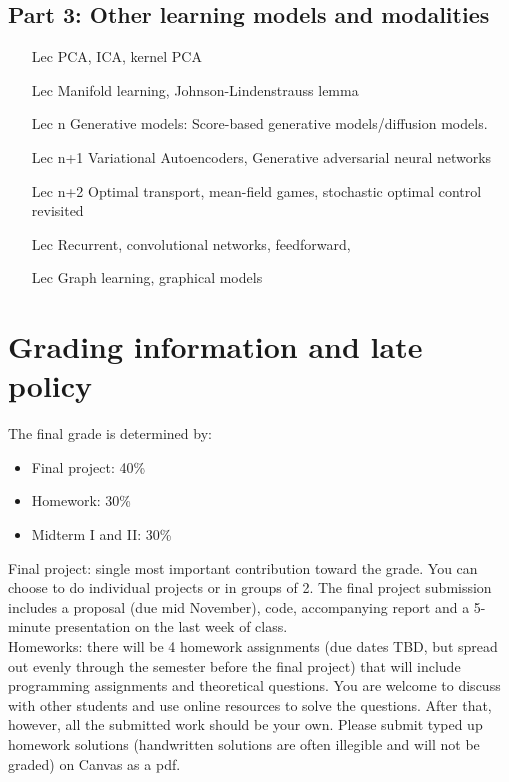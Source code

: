 \documentclass[12pt]{article}
\begin{document}
\subsection*{Part 3: Other learning models and modalities}
\begin{itemize}
	\item[Lec ] PCA, ICA, kernel PCA
	\item[Lec ] Manifold learning, Johnson-Lindenstrauss lemma
	\item[Lec n] Generative models: Score-based generative models/diffusion models.
	\item[Lec n+1] Variational Autoencoders, Generative adversarial neural networks
	\item[Lec n+2] Optimal transport, mean-field games, stochastic optimal control revisited
	\item[Lec ] Recurrent, convolutional networks, feedforward, 
	\item[Lec ] Graph learning, graphical models
\end{itemize}

\section{Grading information and late policy}

The final grade is determined by:
\begin{itemize}
	\item Final project: 40\%
	\item Homework: 30\%
	\item Midterm I and II: 30\%
\end{itemize}
Final project: single most important contribution toward the grade. You can choose to do individual projects or in groups of 2. The final project submission includes a proposal (due mid November), code, accompanying report and a 5-minute presentation on the last week of class.\\

Homeworks: there will be 4 homework assignments (due dates TBD, but spread out evenly through the semester before the final project) that will include programming assignments and theoretical questions. You are welcome to discuss with other students and use online resources to solve the questions. After that, however, all the submitted work should be your own. Please submit typed up homework solutions (handwritten solutions are often illegible and will not be graded) on Canvas as a pdf. \\
\end{document}
